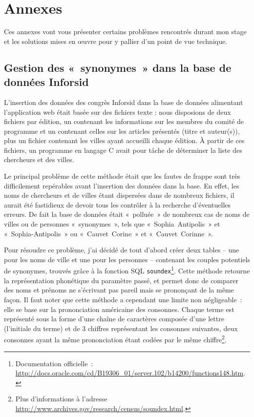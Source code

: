 

\chapter*{Annexes}

Ces annexes vont vous présenter certains problèmes rencontrés durant mon stage et les solutions mises en \oe uvre pour y pallier d'un point de vue technique.

		\section*{Gestion des «~synonymes~» dans la base de données Inforsid}
			L'insertion des données des congrès Inforsid dans la base de données alimentant l'application web était basée sur des fichiers texte : nous disposions de deux fichiers par édition, un contenant les informations sur les membres du comité de programme et un contenant celles sur les articles présentés (titre et auteur(s)), plus un fichier contenant les villes ayant accueilli chaque édition. À partir de ces fichiers, un programme en langage C avait pour tâche de déterminer la liste des chercheurs et des villes.
			
			Le principal problème de cette méthode était que les fautes de frappe sont très difficilement repérables avant l'insertion des données dans la base. En effet, les noms de chercheurs et de villes étant dispersées dans de nombreux fichiers, il aurait été fastidieux de devoir tous les contrôler à la recherche d'éventuelles erreurs. De fait la base de données était «~polluée~» de nombreux cas de noms de villes ou de personnes «~synonymes~», tels que «~Sophia~Antipolis~» et «~Sophia-Antipolis~» ou «~Cauvet~Corine~» et «~Cauvet~Corinne~».
			
			Pour résoudre ce problème, j'ai décidé de tout d'abord créer deux tables -- une pour les noms de ville et une pour les personnes -- contenant les couples potentiels de synonymes, trouvés grâce à la fonction SQL \texttt{soundex}\footnote{Documentation officielle~: \url{http://docs.oracle.com/cd/B19306_01/server.102/b14200/functions148.htm}.}. Cette méthode retourne la représentation phonétique du paramètre passé, et permet donc de comparer des noms et prénoms ne s'écrivant pas pareil mais se prononçant de la même façon. Il faut noter que cette méthode a cependant une limite non négligeable~: elle se base sur la prononciation américaine des consonnes. Chaque terme est représenté sous la forme d'une chaîne de caractères composée d'une lettre (l'initiale du terme) et de 3 chiffres représentant les consonnes suivantes, deux consonnes ayant la même prononciation étant codées par le même chiffre\footnote{Plus d'informations à l'adresse \url{http://www.archives.gov/research/census/soundex.html}.}.
			
